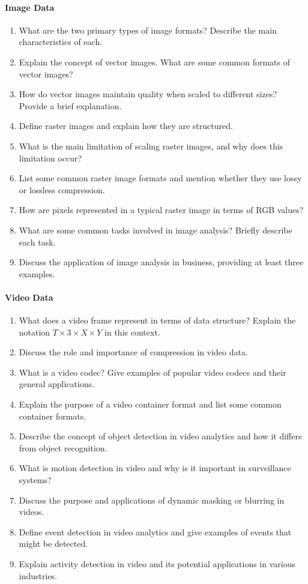 \paragraph*{Image Data}
\begin{enumerate}
    \item What are the two primary types of image formats? Describe the main characteristics of each.
    \item Explain the concept of vector images. What are some common formats of vector images?
    \item How do vector images maintain quality when scaled to different sizes? Provide a brief explanation.
    \item Define raster images and explain how they are structured.
    \item What is the main limitation of scaling raster images, and why does this limitation occur?
    \item List some common raster image formats and mention whether they use lossy or lossless compression.
    \item How are pixels represented in a typical raster image in terms of RGB values? 
    \item What are some common tasks involved in image analysis? Briefly describe each task.
    \item Discuss the application of image analysis in business, providing at least three examples.
\end{enumerate}
\paragraph*{Video Data}
\begin{enumerate}
    \item What does a video frame represent in terms of data structure? Explain the notation \( T \times 3 \times X \times Y \) in this context.
    \item Discuss the role and importance of compression in video data. 
    \item What is a video codec? Give examples of popular video codecs and their general applications.
    \item Explain the purpose of a video container format and list some common container formats.
    \item Describe the concept of object detection in video analytics and how it differs from object recognition.
    \item What is motion detection in video and why is it important in surveillance systems?
    \item Discuss the purpose and applications of dynamic masking or blurring in videos.
    \item Define event detection in video analytics and give examples of events that might be detected.
    \item Explain activity detection in video and its potential applications in various industries.
\end{enumerate}
